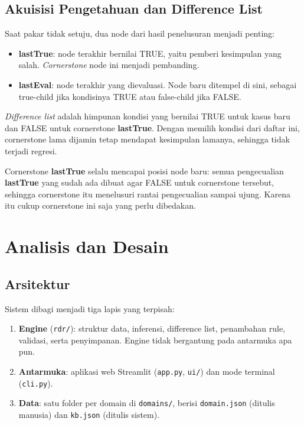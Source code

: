 \documentclass[11pt,a4paper]{article}
\begin{document}
\subsection{Akuisisi Pengetahuan dan Difference List}
Saat pakar tidak setuju, dua node dari hasil penelusuran menjadi penting:
\begin{itemize}[nosep]
  \item \textbf{lastTrue}: node terakhir bernilai TRUE, yaitu pemberi kesimpulan yang salah.
        \emph{Cornerstone} node ini menjadi pembanding.
  \item \textbf{lastEval}: node terakhir yang dievaluasi. Node baru ditempel di sini, sebagai
        true-child jika kondisinya TRUE atau false-child jika FALSE.
\end{itemize}
\emph{Difference list} adalah himpunan kondisi yang bernilai TRUE untuk kasus baru dan FALSE
untuk cornerstone \textbf{lastTrue}. Dengan memilih kondisi dari daftar ini, cornerstone lama
dijamin tetap mendapat kesimpulan lamanya, sehingga tidak terjadi regresi.

Cornerstone \textbf{lastTrue} selalu mencapai posisi node baru: semua pengecualian
\textbf{lastTrue} yang sudah ada dibuat agar FALSE untuk cornerstone tersebut, sehingga
cornerstone itu menelusuri rantai pengecualian sampai ujung. Karena itu cukup cornerstone ini
saja yang perlu dibedakan.

\section{Analisis dan Desain}

\subsection{Arsitektur}
Sistem dibagi menjadi tiga lapis yang terpisah:
\begin{enumerate}[nosep]
  \item \textbf{Engine} (\texttt{rdr/}): struktur data, inferensi, difference list, penambahan
        rule, validasi, serta penyimpanan. Engine tidak bergantung pada antarmuka apa pun.
  \item \textbf{Antarmuka}: aplikasi web Streamlit (\texttt{app.py}, \texttt{ui/}) dan mode
        terminal (\texttt{cli.py}).
  \item \textbf{Data}: satu folder per domain di \texttt{domains/}, berisi
        \texttt{domain.json} (ditulis manusia) dan \texttt{kb.json} (ditulis sistem).
\end{enumerate}
\end{document}
